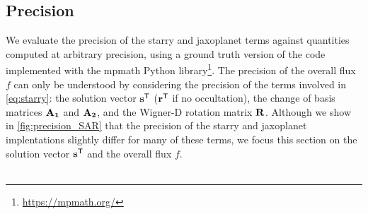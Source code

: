 \documentclass[modern]{aastex631}
\begin{document}
\subsection{Precision}\label{precision}
We evaluate the precision of the \textsf{starry} and \textsf{jaxoplanet} terms against quantities computed at arbitrary precision, using a ground truth version of the code implemented with the \textsf{mpmath} Python library\footnote{\href{https://mpmath.org/}{https://mpmath.org/}}. The precision of the overall flux $f$ can only be understood by considering the precision of the terms involved in \autoref{eq:starry}: the solution vector ${\mathbf{s}}^\mathsf{T}$ (${\mathbf{r}}^\mathsf{T}$ if no occultation), the change of basis matrices ${\mathbf{A_1}}$ and ${\mathbf{A_2}}$, and the Wigner-D rotation matrix ${\mathbf{R}}$. Although we show in \autoref{fig:precision_SAR} that the precision of the \textsf{starry} and \textsf{jaxoplanet} implentations slightly differ for many of these terms, we focus this section on the solution vector ${\mathbf{s}}^\mathsf{T}$ and the overall flux $f$.\\\\
\end{document}
